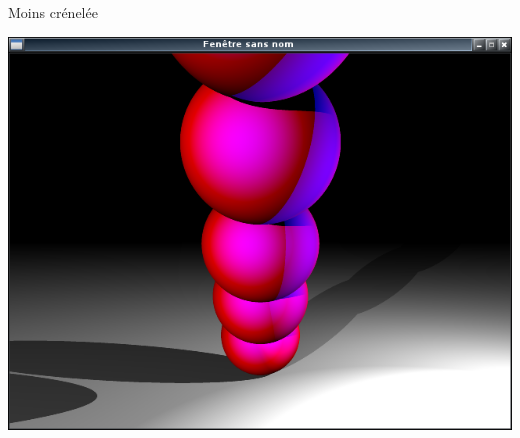 \begin{frame}
{\begin{multicols}{2}
\end{multicols}

}

{
\begin{block}{Moins crénelée}
\begin{center}
	\includegraphics[scale=0.5]{Over.png}
\end{center}
\end{block}
}

\end{frame}

